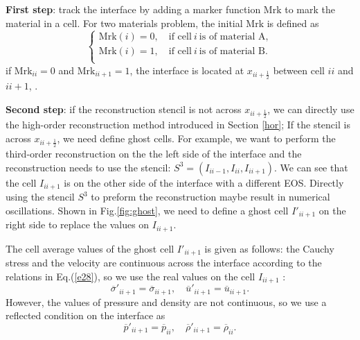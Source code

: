 \documentclass[review]{elsarticle}
\begin{document}
\textbf{First step}: track the interface  by adding  a marker function $\text{Mrk}$  to mark the material in a cell. For two materials problem, the initial $\text{Mrk}$ is defined as
\begin{equation}
  \left\{
  \begin{aligned}
    \text{Mrk}(i) = 0 ,\quad \text{if cell} \ i \ \text{is of  material A}, \\
    \text{Mrk}(i) = 1 ,\quad \text{if cell} \ i \ \text{is  of material B}. \\
\end{aligned}
\right.
\end{equation}
if $\text{Mrk}_{ii} = 0$ and   $\text{Mrk}_{ii+1} = 1$, the interface is located at $x_{ii+\frac{1}{2}}$ between cell $ii$ and $ii+1$,  .

\textbf{Second  step}: if the reconstruction stencil is not across $x_{ii+\frac{1}{2}}$, we can directly use the high-order reconstruction method introduced in  Section \ref{hor}; If the stencil is across $x_{ii+\frac{1}{2}}$, we need define ghost cells. For example, we want to perform the third-order reconstruction on the the  left side of the interface and the reconstruction needs to use  the stencil: $S^3=(I_{ii-1},I_{ii}, I_{ii+1})$. We can see that  the cell $I_{ii+1}$ is  on the other side of the interface with a different EOS. Directly using the  stencil $S^3$ to preform the reconstruction maybe result in numerical oscillations.
Shown in Fig.\ref{fig:ghost}, we need to define   a  ghost cell $I'_{ii+1}$ on the right side to replace  the values on $I_{ii+1}$.


The cell average values of the ghost cell $I'_{ii+1}$ is  given as follows: the Cauchy stress and the velocity  are  continuous across the interface according to the relations in Eq.(\ref{e28}), so we use the real values on  the cell $I_{ii+1}$ :
\begin{equation}
  \overline{\sigma}'_{ii+1} = \overline{\sigma}_{ii+1}, \quad \overline{u}'_{ii+1} = \overline{u}_{ii+1}.
\end{equation}
However, the values of pressure and density are not continuous, so we use a reflected condition on the interface as
\begin{equation}
\overline{p}'_{ii+1} = \overline{p}_{ii}, \quad \overline{\rho}'_{ii+1} = \overline{\rho}_{ii}.
\end{equation}
\end{document}
